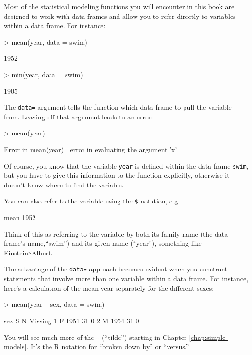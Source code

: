 Most of the statistical modeling functions you will encounter in this
book are designed to work with data frames and allow you to refer
directly to variables within a data frame.  For instance:
\begin{Schunk}
\begin{Sinput}
> mean(year, data = swim)
\end{Sinput}
\begin{Soutput}
[1] 1952
\end{Soutput}
\begin{Sinput}
> min(year, data = swim)
\end{Sinput}
\begin{Soutput}
[1] 1905
\end{Soutput}
\end{Schunk}

The \texttt{data=} argument tells the function which data frame to pull the
variable from.  Leaving off that argument leads to an error:
\begin{Schunk}
\begin{Sinput}
> mean(year)
\end{Sinput}
\end{Schunk}
\begin{Schunk}
\begin{Soutput}
Error in mean(year) : 
   error in evaluating the argument 'x' 
\end{Soutput}
\end{Schunk}

Of course, you know that the variable \texttt{year}
is defined within the data frame \texttt{swim}, but you have to give
this information to the function  explicitly, otherwise
it doesn't know where to find the variable.  

You can also refer to the variable using the \verb+$+ notation, e.g.
\begin{Schunk}
\begin{Soutput}
mean 
1952 
\end{Soutput}
\end{Schunk}
Think of this as referring to the variable by both its family name
(the data frame's name,``swim'') and its given name (``year''), something
like Einstein\$Albert.

The advantage of the \texttt{data=} approach becomes evident when you
construct statements that involve more than one variable within a data
frame.  For instance, here's a calculation of the mean year separately
for the different sexes:
\begin{Schunk}
\begin{Sinput}
> mean(year ~ sex, data = swim)
\end{Sinput}
\begin{Soutput}
  sex    S  N Missing
1   F 1951 31       0
2   M 1954 31       0
\end{Soutput}
\end{Schunk}
You will see much more of the \verb+~+ (``tilde'') 
starting in Chapter \ref{chap:simple-models}.  It's the R notation for ``broken down by'' or ``versus.''

